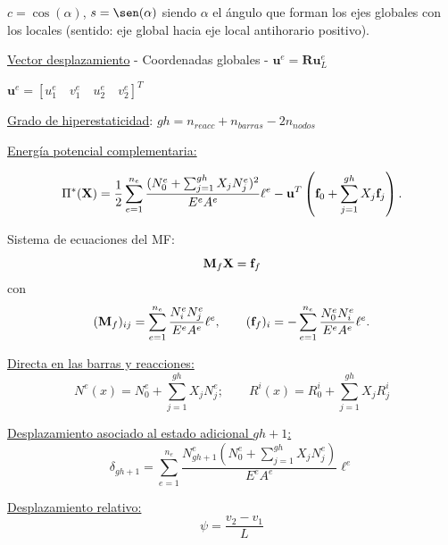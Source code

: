 \vspace{-0.2cm}
$c=\cos(\alpha)$, $s=\sen(\alpha)$ siendo $\alpha$ el ángulo que forman los ejes globales con los locales (sentido: eje global hacia eje local antihorario positivo).

\vspace{0.3cm}
\underline{Vector desplazamiento} - Coordenadas globales - $\textbf{u}^e=\textbf{R} \textbf{u}_ L^e$

\vspace{0.3cm}
$\textbf{u}^e=[u_1^e \quad v_1^e  \quad u_2^e \quad v_2^e]^T$ \centering


\begin{center}
\end{center}


\underline{Grado de hiperestaticidad}: $gh = n_{reacc} + n_{barras} - 2 n_{nodos}$\raggedright

\vspace{0.3cm}
\underline{Energía potencial complementaria:}\raggedright

$$
\Pi^* ({\bf X}) = \frac{1}{2}  \sum_{e=1}^{n_e} \frac{(N_0^e + \sum_{j=1}^{gh} X_j N_j^e)^2}{E^e A^e} \ell^e - {\bf u}^T \left( {\bf f}_0 +  \sum_{j=1}^{gh} X_j {\bf f}_j \right).
$$


Sistema de ecuaciones del MF:
$$
{\bf M}_f {\bf X} = {\bf f}_f
$$
%
con
$$
({\bf M}_f)_{ij} =  \sum_{e=1}^{n_e} \frac{N_i^e N_j^e }{E^e A^e} \ell^e,
\qquad
({\bf f}_f)_{i} =  - \sum_{e=1}^{n_e} \frac{N_0^e N_i^e }{E^e A^e} \ell^e.
$$

\underline{Directa en las barras y reacciones:}
$$
N^e (x)=N_0^e +  \sum_{j=1}^{gh} X_j N_j^e ;
\qquad
R^i(x)=R_0^i +  \sum_{j=1}^{gh} X_j R_j^i
$$

\underline{Desplazamiento asociado al estado adicional $gh+1$:}
$$
\delta_{gh+1}= \sum_{e=1}^{n_e} \frac{N_{gh+1}^e (N_0^e + \sum_{j=1}^{gh} X_j N_j^e)}{E^e A^e} \ell^e 
$$

\begin{center}
\end{center}

\begin{center}
 \def\svgwidth{0.75\textwidth}
 
\end{center}

\underline{Desplazamiento relativo:}
$$\psi=\frac{v_2 - v_1}{L}$$

